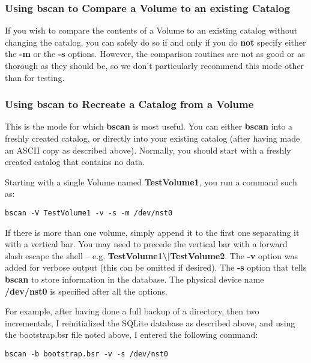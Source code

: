 \subsubsection{Using bscan to Compare a Volume to an existing Catalog}

If you wish to compare the contents of a Volume to an existing catalog without
changing the catalog, you can safely do so if and only if you do {\bf not}
specify either the {\bf -m} or the {\bf -s} options.
However, the comparison routines are not as good or as thorough
as they should be, so we don't particularly recommend this mode other than for
testing.

\subsubsection{Using bscan to Recreate a Catalog from a Volume}

This is the mode for which {\bf bscan} is most useful. You can either {\bf
bscan} into a freshly created catalog, or directly into your existing catalog
(after having made an ASCII copy as described above). Normally, you should
start with a freshly created catalog that contains no data.

Starting with a single Volume named {\bf TestVolume1}, you run a command such
as:

\footnotesize
\begin{verbatim}
bscan -V TestVolume1 -v -s -m /dev/nst0
\end{verbatim}
\normalsize

If there is more than one volume, simply append it to the first one separating
it with a vertical bar. You may need to precede the vertical bar with a
forward slash escape the shell -- e.g. {\bf
TestVolume1\textbackslash{}|TestVolume2}. The {\bf -v} option was added for
verbose output (this can be omitted if desired). The {\bf -s} option that
tells {\bf bscan} to store information in the database. The physical device
name {\bf /dev/nst0} is specified after all the options.

{\bf} For example, after having done a full backup of a directory, then two
incrementals, I reinitialized the SQLite database as described above, and
using the bootstrap.bsr file noted above, I entered the following command:

\footnotesize
\begin{verbatim}
bscan -b bootstrap.bsr -v -s /dev/nst0
\end{verbatim}
\normalsize

